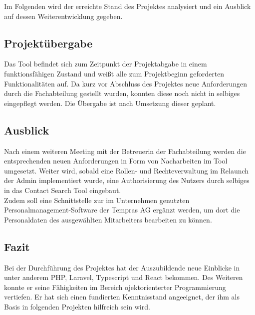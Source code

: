 Im Folgenden wird der erreichte Stand des Projektes analysiert und ein Ausblick auf dessen Weiterentwicklung gegeben.

\subsection{Projektübergabe}
    Das Tool befindet sich zum Zeitpunkt der Projektabgabe in einem funktionsfähigen Zustand und weißt alle zum Projektbeginn geforderten Funktionalitäten auf. Da kurz vor Abschluss des Projektes neue Anforderungen durch die Fachabteilung gestellt wurden, konnten diese noch nicht in selbiges eingepflegt werden. Die Übergabe ist nach Umsetzung dieser geplant.

\subsection{Ausblick}
    Nach einem weiteren Meeting mit der Betreuerin der Fachabteilung werden die entsprechenden neuen Anforderungen in Form von Nacharbeiten im Tool umgesetzt. Weiter wird, sobald eine Rollen- und Rechteverwaltung im Relaunch der Admin implementiert wurde, eine Authorisierung des Nutzers durch selbiges in das Contact Search Tool eingebaut.\\
    Zudem soll eine Schnittstelle zur im Unternehmen genutzten Personalmanagement-Software der Tempras AG ergänzt werden, um dort die Personaldaten des ausgewählten Mitarbeiters bearbeiten zu können.

\subsection{Fazit}
    Bei der Durchführung des Projektes hat der Auszubildende neue Einblicke in unter anderem PHP, Laravel, Typescript und React bekommen. Des Weiteren konnte er seine Fähigkeiten im Bereich ojektorienterter Programmierung vertiefen. Er hat sich einen fundierten Kenntnisstand angeeignet, der ihm als Basis in folgenden Projekten hilfreich sein wird.